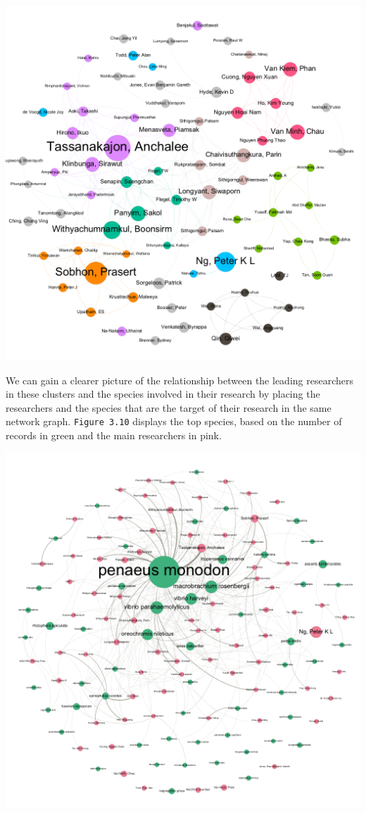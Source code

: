 \documentclass[]{book}
\theoremstyle{definition}
\theoremstyle{definition}
\theoremstyle{definition}
\theoremstyle{remark}
\begin{document}
\includegraphics[width=14.22in]{images/aseanmarinlit_author20plus}

We can gain a clearer picture of the relationship between the leading
researchers in these clusters and the species involved in their research
by placing the researchers and the species that are the target of their
research in the same network graph. \texttt{Figure\ 3.10} displays the
top species, based on the number of records in green and the main
researchers in pink.

\includegraphics[width=14.22in]{images/asean_authors_species_directed}
\end{document}
